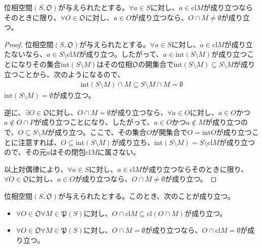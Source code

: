 \documentclass[dvipdfmx]{jsarticle}
\begin{document}
\begin{thm}\label{8.1.1.9}
位相空間$\left( S,\mathfrak{O} \right)$が与えられたとする。$\forall a \in S$に対し、$a \in {\mathrm{cl}}M$が成り立つならそのときに限り、$\forall O \in \mathfrak{O}$に対し、$a \in O$が成り立つなら、$O \cap M \neq \emptyset$が成り立つ。
\end{thm}
\begin{proof}
位相空間$\left( S,\mathfrak{O} \right)$が与えられたとする。$\forall a \in S$に対し、$a \in {\mathrm{cl}}M$が成り立たないなら、$a \in S \setminus {\mathrm{cl}}M$が成り立つ。したがって、$a \in {\mathrm{int}}(S \setminus M)$が成り立つことになりその集合${\mathrm{int}}(S \setminus M)$はその位相$\mathfrak{O}$の開集合で${\mathrm{int}}(S \setminus M) \subseteq S \setminus M$が成り立つことから、次のようになるので、
\begin{align*}
{\mathrm{int}}(S \setminus M) \cap M \subseteq S \setminus M \cap M = \emptyset
\end{align*}
${\mathrm{int}}(S \setminus M) = \emptyset$が成り立つ。\par
逆に、$\exists O \in \mathfrak{O}$に対し、$O \cap M = \emptyset$が成り立つなら、$\forall a \in O$に対し、$a \in O$かつ$a \notin O \cap P$が成り立つことになり、したがって、$a \in O$かつ$a \notin M$が成り立つので、$O \subseteq S \setminus M$が成り立つ。ここで、その集合$O$が開集合で$O = {\mathrm{int}}O$が成り立つことに注意すれば、$O \subseteq {\mathrm{int}}(S \setminus M)$が成り立ち、${\mathrm{int}}(S \setminus M) = S \setminus {\mathrm{cl}}M$が成り立つので、その元$a$はその閉包${\mathrm{cl}}M$に属さない。\par
以上対偶律により、$\forall a \in S$に対し、$a \in {\mathrm{cl}}M$が成り立つならそのときに限り、$\forall O \in \mathfrak{O}$に対し、$a \in O$が成り立つなら、$O \cap M \neq \emptyset$が成り立つ。
\end{proof}
\begin{thm}\label{8.1.1.10}
位相空間$\left( S,\mathfrak{O} \right)$が与えられたとする。このとき、次のことが成り立つ。
\begin{itemize}
\item
  $\forall O \in \mathfrak{O\forall}M \in \mathfrak{P}(S)$に対し、$O \cap {\mathrm{cl}}M \subseteq {\mathrm{cl}}(O \cap M)$が成り立つ。
\item
  $\forall O \in \mathfrak{O\forall}M \in \mathfrak{P}(S)$に対し、$O \cap M = \emptyset$が成り立つなら、$O \cap {\mathrm{cl}}M = \emptyset$が成り立つ。
\end{itemize}
\end{thm}
\end{document}
